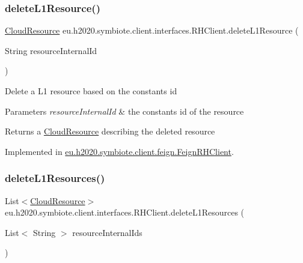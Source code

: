 \subsubsection{\texorpdfstring{delete\+L1\+Resource()}{deleteL1Resource()}}
{\footnotesize\ttfamily \hyperlink{classeu_1_1h2020_1_1symbiote_1_1cloud_1_1model_1_1internal_1_1CloudResource}{Cloud\+Resource} eu.\+h2020.\+symbiote.\+client.\+interfaces.\+R\+H\+Client.\+delete\+L1\+Resource (\begin{DoxyParamCaption}\item[{String}]{resource\+Internal\+Id }\end{DoxyParamCaption})}

Delete a L1 resource based on the constants id


\begin{DoxyParams}{Parameters}
{\em resource\+Internal\+Id} & the constants id of the resource \\
\hline
\end{DoxyParams}
\begin{DoxyReturn}{Returns}
a \hyperlink{}{Cloud\+Resource} describing the deleted resource 
\end{DoxyReturn}


Implemented in \hyperlink{classeu_1_1h2020_1_1symbiote_1_1client_1_1feign_1_1FeignRHClient_aef7c169c970267f47e7c56812c9a7422}{eu.\+h2020.\+symbiote.\+client.\+feign.\+Feign\+R\+H\+Client}.

\mbox{\label{interfaceeu_1_1h2020_1_1symbiote_1_1client_1_1interfaces_1_1RHClient_a69bba5fe6031648cc2636866cfe6f103}} 
\subsubsection{\texorpdfstring{delete\+L1\+Resources()}{deleteL1Resources()}}
{\footnotesize\ttfamily List$<$\hyperlink{classeu_1_1h2020_1_1symbiote_1_1cloud_1_1model_1_1internal_1_1CloudResource}{Cloud\+Resource}$>$ eu.\+h2020.\+symbiote.\+client.\+interfaces.\+R\+H\+Client.\+delete\+L1\+Resources (\begin{DoxyParamCaption}\item[{List$<$ String $>$}]{resource\+Internal\+Ids }\end{DoxyParamCaption})}

